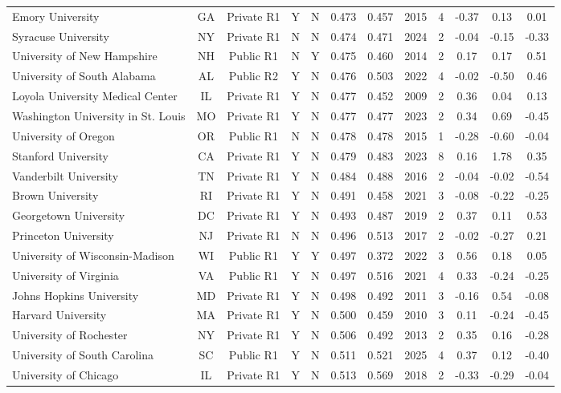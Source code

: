 \begin{longtable}{@{}p{3.55cm}ccccccccccc@{}}
Emory University & GA & Private R1 & Y & N & 0.473 & 0.457 & 2015 & 4 & -0.37 & 0.13 & 0.01 \\
Syracuse University & NY & Private R1 & N & N & 0.474 & 0.471 & 2024 & 2 & -0.04 & -0.15 & -0.33 \\
University of New Hampshire & NH & Public R1 & N & Y & 0.475 & 0.460 & 2014 & 2 & 0.17 & 0.17 & 0.51 \\
University of South Alabama & AL & Public R2 & Y & N & 0.476 & 0.503 & 2022 & 4 & -0.02 & -0.50 & 0.46 \\
Loyola University Medical Center & IL & Private R1 & Y & N & 0.477 & 0.452 & 2009 & 2 & 0.36 & 0.04 & 0.13 \\
Washington University in St. Louis & MO & Private R1 & Y & N & 0.477 & 0.477 & 2023 & 2 & 0.34 & 0.69 & -0.45 \\
University of Oregon & OR & Public R1 & N & N & 0.478 & 0.478 & 2015 & 1 & -0.28 & -0.60 & -0.04 \\
Stanford University & CA & Private R1 & Y & N & 0.479 & 0.483 & 2023 & 8 & 0.16 & 1.78 & 0.35 \\
Vanderbilt University & TN & Private R1 & Y & N & 0.484 & 0.488 & 2016 & 2 & -0.04 & -0.02 & -0.54 \\
Brown University & RI & Private R1 & Y & N & 0.491 & 0.458 & 2021 & 3 & -0.08 & -0.22 & -0.25 \\
Georgetown University & DC & Private R1 & Y & N & 0.493 & 0.487 & 2019 & 2 & 0.37 & 0.11 & 0.53 \\
Princeton University & NJ & Private R1 & N & N & 0.496 & 0.513 & 2017 & 2 & -0.02 & -0.27 & 0.21 \\
University of Wisconsin-Madison & WI & Public R1 & Y & Y & 0.497 & 0.372 & 2022 & 3 & 0.56 & 0.18 & 0.05 \\
University of Virginia & VA & Public R1 & Y & N & 0.497 & 0.516 & 2021 & 4 & 0.33 & -0.24 & -0.25 \\
Johns Hopkins University & MD & Private R1 & Y & N & 0.498 & 0.492 & 2011 & 3 & -0.16 & 0.54 & -0.08 \\
Harvard University & MA & Private R1 & Y & N & 0.500 & 0.459 & 2010 & 3 & 0.11 & -0.24 & -0.45 \\
University of Rochester & NY & Private R1 & Y & N & 0.506 & 0.492 & 2013 & 2 & 0.35 & 0.16 & -0.28 \\
University of South Carolina & SC & Public R1 & Y & N & 0.511 & 0.521 & 2025 & 4 & 0.37 & 0.12 & -0.40 \\
University of Chicago & IL & Private R1 & Y & N & 0.513 & 0.569 & 2018 & 2 & -0.33 & -0.29 & -0.04 \\

\end{longtable}
